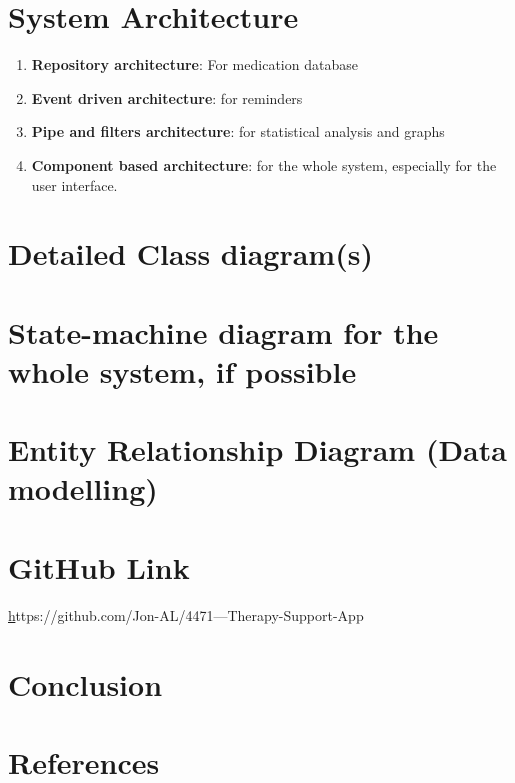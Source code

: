 \documentclass[11pt]{article}
\begin{document}
    \section{System Architecture}\label{sec:system-architecture}

    \begin{enumerate}
        \item \textbf{Repository architecture}: For medication database
        \item \textbf{Event driven architecture}: for reminders
        \item \textbf{Pipe and filters architecture}: for statistical analysis and graphs
        \item \textbf{Component based architecture}: for the whole system, especially for the user interface.
    \end{enumerate}


    \section{Detailed Class diagram(s)}\label{sec:detailed-class-diagram(s)}


    \section{State-machine diagram {for the whole system, if possible}}\label{sec:state-machine-diagram}


    \section{Entity Relationship Diagram (Data modelling)}\label{sec:er--diagram-(data-modelling)}


    \section{GitHub Link}\label{sec:github-link}
    \href{Group Therapy-Support-App}
    https://github.com/Jon-AL/4471---Therapy-Support-App


    \section{Conclusion}\label{sec:conclusion}


    \section{References}\label{sec:reference}
\end{document}
